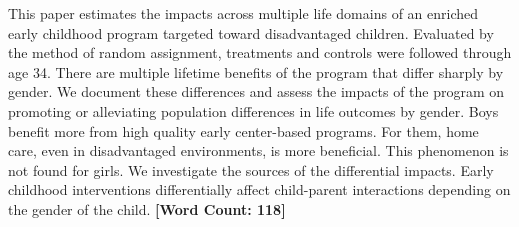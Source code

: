 \noindent This paper estimates the impacts across multiple life domains of an enriched early childhood program targeted toward disadvantaged children. Evaluated by the method of random assignment, treatments and controls were followed through age 34. There are multiple lifetime benefits of the program that differ sharply by gender. We document these differences and assess the impacts of the program on promoting or alleviating population differences in life outcomes by gender. Boys benefit more from high quality early center-based programs. For them, home care, even in disadvantaged environments, is more beneficial. This phenomenon is not found for girls. We investigate the sources of the differential impacts. Early childhood interventions differentially affect child-parent interactions depending on the gender of the child. \textbf{[Word Count: 118]}
